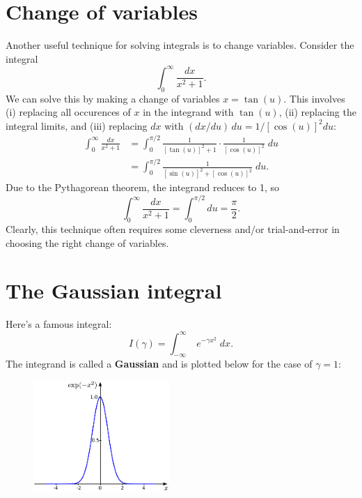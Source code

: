 \documentclass[10pt,a4paper]{article}
\begin{document}
\section{Change of variables}
\label{change-of-variables}

Another useful technique for solving integrals is to change variables.
Consider the integral
\begin{equation}
  \int_0^\infty \frac{dx}{x^2 + 1}.
\end{equation}
We can solve this by making a change of variables $x = \tan(u)$. This
involves (i) replacing all occurences of $x$ in the integrand with
$\tan(u)$, (ii) replacing the integral limits, and (iii) replacing
$dx$ with $(dx/du) \, du = 1/[\cos(u)]^2 du$:
\begin{align}
  \int_0^\infty \frac{dx}{x^2 + 1} &= \int_0^{\pi/2} \frac{1}{[\tan(u)]^2 + 1} \cdot \frac{1}{[\cos(u)]^2} \; du \\ &= \int_0^{\pi/2} \frac{1}{[\sin(u)]^2 + [\cos(u)]^2} \; du.
\end{align}
Due to the Pythagorean theorem, the integrand reduces to 1, so
\begin{equation}
  \int_0^\infty \frac{dx}{x^2 + 1} = \int_0^{\pi/2} du = \frac{\pi}{2}.
\end{equation}
Clearly, this technique often requires some cleverness and/or
trial-and-error in choosing the right change of variables.

\section{The Gaussian integral}

Here's a famous integral:
\begin{equation}
  I(\gamma) = \int_{-\infty}^\infty \; e^{-\gamma x^2} \; dx.
  \label{gaussian}
\end{equation}
The integrand is called a \textbf{Gaussian} and is plotted below for
the case of $\gamma = 1$:

\begin{figure}[h]
  \centering\includegraphics[width=0.46\textwidth]{gaussian}
\end{figure}
\end{document}
